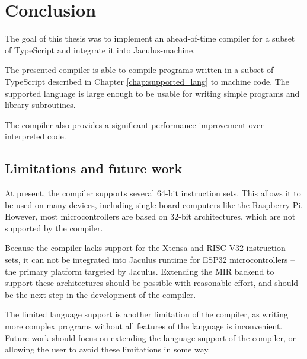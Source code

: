 \chapter{Conclusion}


The goal of this thesis was to implement an ahead-of-time compiler for a subset of TypeScript and integrate it into Jaculus-machine.

The presented compiler is able to compile programs written in a subset of TypeScript described in Chapter \ref{chap:supported_lang} to machine code. The supported language is large enough to be usable for writing simple programs and library subroutines.

The compiler also provides a significant performance improvement over interpreted code.


\section{Limitations and future work}

At present, the compiler supports several 64-bit instruction sets. This allows it to be used on many devices, including single-board computers like the Raspberry Pi. However, most microcontrollers are based on 32-bit architectures, which are not supported by the compiler.

Because the compiler lacks support for the Xtensa and RISC-V32 instruction sets, it can not be integrated into Jaculus runtime for ESP32 microcontrollers -- the primary platform targeted by Jaculus. Extending the MIR backend to support these architectures should be possible with reasonable effort, and should be the next step in the development of the compiler.

The limited language support is another limitation of the compiler, as writing more complex programs without all features of the language is inconvenient. Future work should focus on extending the language support of the compiler, or allowing the user to avoid these limitations in some way.
